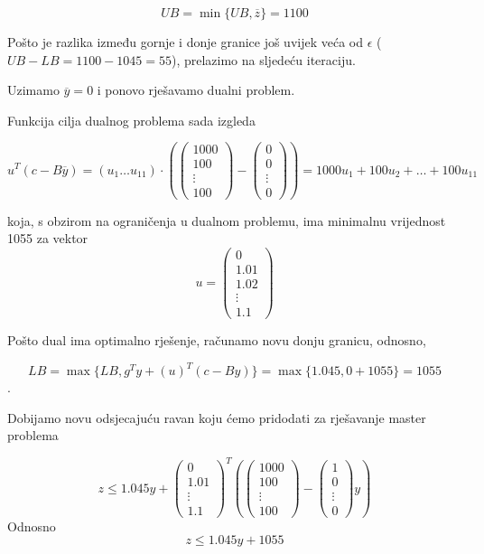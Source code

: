 \documentclass[a4paper, utf8, 11pt, colorlinks]{book}
\begin{document}
$$UB = \min\{UB,\overline{z}\} = 1100$$

Pošto je razlika između gornje i donje granice još uvijek veća od $\epsilon$ ($UB-LB = 1100-1045=55$), prelazimo na sljedeću iteraciju.

Uzimamo $\overline{y}=0$ i ponovo rješavamo dualni problem.

Funkcija cilja dualnog problema sada izgleda 

 $$
u^T (c-B\overline{y})=(u_1\ldots u_{11})\cdot \left(\left(\begin{array}{c}
	1000 \\
	100 \\
	\vdots \\
	100
\end{array}\right)-\left(\begin{array}{c}
	0 \\
	0 \\
	\vdots \\
	0
\end{array}\right)\right) =1000u_1+ 100u_2+\ldots+100u_{11}
$$

koja, s obzirom na ograničenja u dualnom problemu, ima minimalnu vrijednost 1055 za vektor $$u=\left(\begin{array}{c}
	0\\
	1.01 \\
	1.02 \\
	\vdots \\
	1.1
\end{array}\right)$$

Pošto dual ima optimalno rješenje, računamo novu donju granicu, odnosno,


$$LB = \max\{LB,g^Ty+(u)^T(c-By)\}=\max\{1.045,0+ 1055\} = 1055$$.

Dobijamo novu odsjecajuću ravan koju ćemo pridodati za rješavanje master problema

$$z\leqslant 1.045y+\left(\begin{array}{c}
	0\\
	1.01 \\
	\vdots \\
	1.1
\end{array}\right)^T
\left(\left(\begin{array}{c}
	1000 \\
	100 \\
	\vdots \\
	100
\end{array}\right)-\left(\begin{array}{c}
	1 \\
	0 \\
	\vdots \\
	0
\end{array}\right)y\right)$$
Odnosno 
$$z\leqslant 1.045y+1055$$
\end{document}
